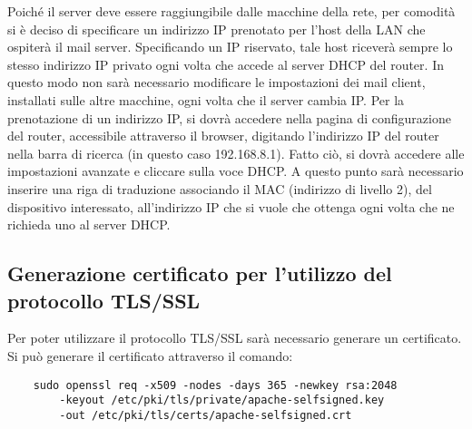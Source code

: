 Poiché il server deve essere raggiungibile dalle macchine della rete, 
per comodità si è deciso di specificare un indirizzo IP prenotato per l’host della LAN che ospiterà il mail server. 
Specificando un IP riservato, tale host riceverà sempre lo stesso indirizzo IP privato ogni volta che accede al 
server DHCP del router. In questo modo non sarà necessario modificare le impostazioni dei mail client, 
installati sulle altre macchine, ogni volta che il server cambia IP.
Per la prenotazione di un indirizzo IP, si dovrà accedere nella pagina di configurazione del router, 
accessibile attraverso il browser, digitando l’indirizzo IP del router nella barra di ricerca 
(in questo caso 192.168.8.1). Fatto ciò, si dovrà accedere alle impostazioni avanzate e cliccare sulla voce DHCP. 
A questo punto sarà necessario inserire una riga di traduzione associando il MAC (indirizzo di livello 2), 
del dispositivo interessato, all’indirizzo IP che si vuole che ottenga ogni volta che ne richieda uno al server DHCP.

\begin{table}[htp]
    \centering
    \end{table}

\subsection{Generazione certificato per l'utilizzo del protocollo TLS/SSL}
Per poter utilizzare il protocollo TLS/SSL sarà necessario generare un certificato.
Si può generare il certificato attraverso il comando:

\begin{verbatim}
    sudo openssl req -x509 -nodes -days 365 -newkey rsa:2048 
        -keyout /etc/pki/tls/private/apache-selfsigned.key 
        -out /etc/pki/tls/certs/apache-selfsigned.crt
\end{verbatim}

